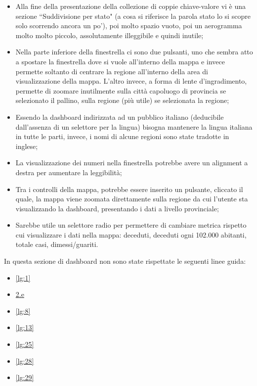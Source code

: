 \begin{itemize}
    \item Alla fine della presentazione della collezione di coppie chiave-valore vi è una sezione ``Suddivisione per stato" (a cosa si riferisce la parola stato lo si scopre solo scorrendo ancora un po'), poi molto spazio vuoto, poi un aerogramma molto molto piccolo, assolutamente illeggibile e quindi inutile;
    \item Nella parte inferiore della finestrella ci sono due pulsanti, uno che sembra atto a spostare la finestrella dove si vuole all'interno della mappa e invece permette soltanto di centrare la regione all'interno della area di visualizzazione della mappa. L'altro invece, a forma di lente d'ingradimento, permette di zoomare inutilmente sulla città capoluogo di provincia se selezionato il pallino, sulla regione (più utile) se selezionata la regione;
    \item Essendo la dashboard indirizzata ad un pubblico italiano (deducibile dall'assenza di un selettore per la lingua) bisogna mantenere la lingua italiana in tutte le parti, invece, i nomi di alcune regioni sono state tradotte in inglese;
    \item La visualizzazione dei numeri nella finestrella potrebbe avere un alignment a destra per aumentare la leggibilità;
    \item Tra i controlli della mappa, potrebbe essere inserito un pulsante, cliccato il quale, la mappa viene zoomata direttamente sulla regione da cui l'utente sta visualizzando la dashboard, presentando i dati a livello provinciale;
    \item Sarebbe utile un selettore radio per permettere di cambiare metrica rispetto cui visualizzare i dati nella mappa: deceduti, deceduti ogni 102.000 abitanti, totale casi, dimessi/guariti.
\end{itemize}
In questa sezione di dashboard non sono state rispettate le seguenti linee guida:
\begin{itemize}
    \item \ref{lg:1}
    \item \hyperref[lg:2.e]{2.e}
    \item \ref{lg:8}
    \item \ref{lg:13}
    \item \ref{lg:25}
    \item \ref{lg:28}
    \item \ref{lg:29}
\end{itemize}

